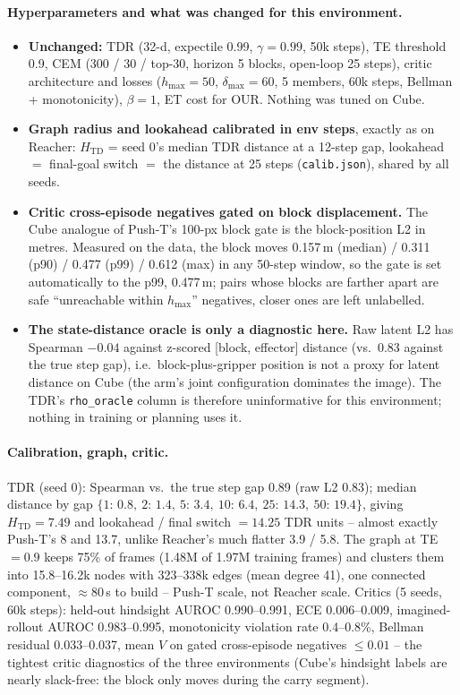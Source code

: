 \documentclass[11pt]{article}
\newcommand{\Htd}{H_{\mathrm{TD}}}
\begin{document}
\paragraph{Hyperparameters and what was changed for this environment.}
\begin{itemize}[nosep]
  \item \textbf{Unchanged:} TDR (32-d, expectile 0.99, $\gamma=0.99$, 50k steps), TE
        threshold 0.9, CEM (300 / 30 / top-30, horizon 5 blocks, open-loop 25 steps), critic
        architecture and losses ($h_{\max}=50$, $\delta_{\max}=60$, 5 members, 60k steps,
        Bellman + monotonicity), $\beta=1$, ET cost for OUR. Nothing was tuned on Cube.
  \item \textbf{Graph radius and lookahead calibrated in env steps}, exactly as on Reacher:
        $\Htd$ = seed 0's median TDR distance at a 12-step gap, lookahead $=$ final-goal
        switch $=$ the distance at 25 steps (\texttt{calib.json}), shared by all seeds.
  \item \textbf{Critic cross-episode negatives gated on block displacement.} The Cube
        analogue of Push-T's 100-px block gate is the block-position L2 in metres. Measured on
        the data, the block moves 0.157\,m (median) / 0.311 (p90) / 0.477 (p99) / 0.612 (max)
        in any 50-step window, so the gate is set automatically to the p99, 0.477\,m; pairs
        whose blocks are farther apart are safe ``unreachable within $h_{\max}$'' negatives,
        closer ones are left unlabelled.
  \item \textbf{The state-distance oracle is only a diagnostic here.} Raw latent L2 has
        Spearman $-0.04$ against z-scored [block, effector] distance (vs.\ 0.83 against the
        true step gap), i.e.\ block-plus-gripper position is not a proxy for latent distance
        on Cube (the arm's joint configuration dominates the image). The TDR's
        \texttt{rho\_oracle} column is therefore uninformative for this environment; nothing
        in training or planning uses it.
\end{itemize}

\paragraph{Calibration, graph, critic.} TDR (seed 0): Spearman vs.\ the true step gap 0.89
(raw L2 0.83); median distance by gap $\{1{:}\,0.8,\ 2{:}\,1.4,\ 5{:}\,3.4,\ 10{:}\,6.4,\
25{:}\,14.3,\ 50{:}\,19.4\}$, giving $\Htd = 7.49$ and lookahead / final switch $= 14.25$ TDR
units -- almost exactly Push-T's 8 and 13.7, unlike Reacher's much flatter 3.9 / 5.8. The
graph at TE$=0.9$ keeps 75\% of frames (1.48M of 1.97M training frames) and clusters them into
15.8--16.2k nodes with 323--338k edges (mean degree 41), one connected component, $\approx$80\,s
to build -- Push-T scale, not Reacher scale. Critics (5 seeds, 60k steps): held-out hindsight
AUROC 0.990--0.991, ECE 0.006--0.009, imagined-rollout AUROC 0.983--0.995, monotonicity
violation rate 0.4--0.8\%, Bellman residual 0.033--0.037, mean $V$ on gated cross-episode
negatives $\le 0.01$ -- the tightest critic diagnostics of the three environments (Cube's
hindsight labels are nearly slack-free: the block only moves during the carry segment).
\end{document}

